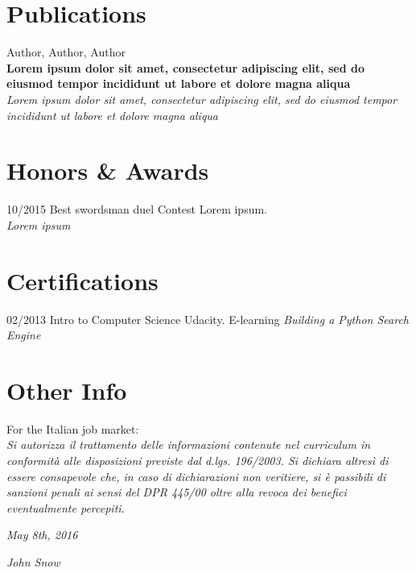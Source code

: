 \documentclass[]{friggeri-cv}
\begin{document}
\section{Publications}
Author, Author, Author\\
\textbf{Lorem ipsum dolor sit amet, consectetur adipiscing elit, sed do eiusmod tempor incididunt ut labore et dolore magna aliqua}\\
\emph{Lorem ipsum dolor sit amet, consectetur adipiscing elit, sed do eiusmod tempor incididunt ut labore et dolore magna aliqua}
\\
\section{Honors \& Awards}
\begin{entrylist}
  \entry
    {10/2015}
    {Best swordsman duel}
    {Contest}
    {Lorem ipsum.\\
    \emph{Lorem ipsum}}
\end{entrylist}

\section{Certifications}
\begin{entrylist}
  \entry
    {02/2013}
    {Intro to Computer Science}
    {Udacity. E-learning}
    {\emph{Building a Python Search Engine}}
\end{entrylist}

\section{Other Info}
For the Italian job market:\\
\emph{Si autorizza il trattamento delle informazioni contenute nel curriculum in conformità alle disposizioni previste dal d.lgs. 196/2003. Si dichiara altresì di essere consapevole che, in caso di dichiarazioni non veritiere, si è passibili di sanzioni penali ai sensi del DPR 445/00 oltre alla revoca dei benefici eventualmente percepiti.}
\\
\begin{flushleft}
\emph{May 8th, 2016}
\end{flushleft}
\begin{flushright}
\emph{John Snow}
\end{flushright}
\end{document}
